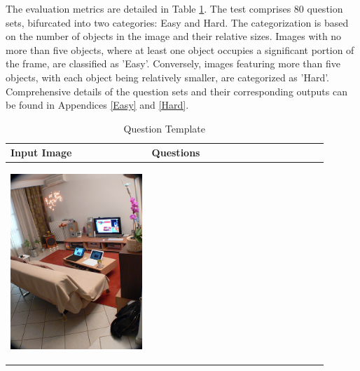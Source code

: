 \documentclass[journal,10pt]{IEEEtran}
\begin{document}
The evaluation metrics are detailed in Table \ref{tab:question_template}. The test comprises 80 question sets, bifurcated into two categories: Easy and Hard. The categorization is based on the number of objects in the image and their relative sizes. Images with no more than five objects, where at least one object occupies a significant portion of the frame, are classified as 'Easy'. Conversely, images featuring more than five objects, with each object being relatively smaller, are categorized as 'Hard'. Comprehensive details of the question sets and their corresponding outputs can be found in Appendices \ref{Easy} and \ref{Hard}.
\begin{table}[ht]
    \centering
    \caption{Question Template}
    \label{tab:question_template}
    \begin{tabular}{|p{0.4\linewidth}|p{0.5\linewidth}|}
        \hline
        \textbf{Input Image} &\textbf{Questions}\\
        \hline
        \begin{center} \includegraphics[width=\linewidth]{../image set/hard/000000104739.jpg} \end{center}

\end{tabular}
\end{table}
\end{document}
